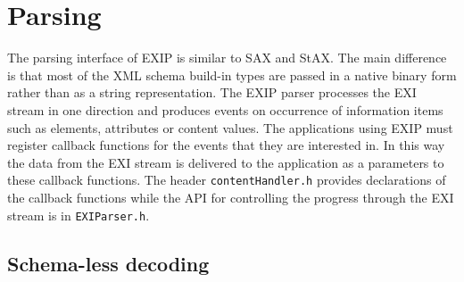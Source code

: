 \section{Parsing}
\label{sec:Parsing}

The parsing interface of EXIP is similar to SAX and StAX. The main difference is
that most of the XML schema build-in types are passed in a native binary form
rather than as a string representation.
The EXIP parser processes the EXI stream in one direction and produces events
on occurrence of information items such as elements, attributes or content values.
The applications using EXIP must register callback functions for the events that they are interested in.
In this way the data from the EXI stream is delivered to the application as a
parameters to these callback functions.
The header \texttt{contentHandler.h} provides declarations of the callback functions
while the API for controlling the progress through the EXI stream is in \texttt{EXIParser.h}.

\subsection{Schema-less decoding}

